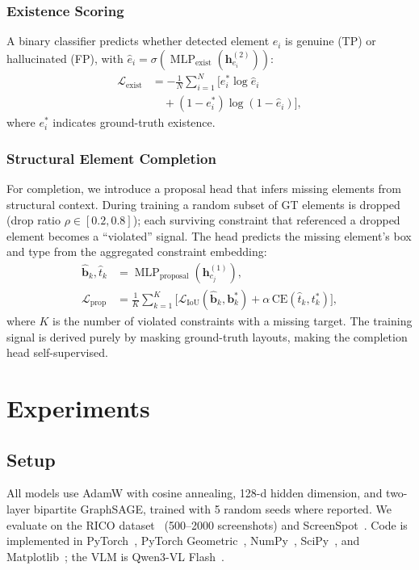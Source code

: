 \documentclass[conference]{IEEEtran}
\begin{document}
\subsubsection{Existence Scoring}
A binary classifier predicts whether detected element $e_i$ is genuine (TP)
or hallucinated (FP), with $\hat{e}_i=\sigma(\operatorname{MLP}_{\text{exist}}
(\mathbf{h}_{e_i}^{(2)}))$:
\begin{equation}
\begin{aligned}
\mathcal{L}_{\text{exist}} &= -\frac{1}{N}\sum_{i=1}^{N}\bigl[e_i^*\log\hat{e}_i \\
&\quad +(1-e_i^*)\log(1-\hat{e}_i)\bigr],
\end{aligned}
\label{eq:lexist}
\end{equation}
where $e_i^*$ indicates ground-truth existence.

\subsubsection{Structural Element Completion}
For completion, we introduce a proposal head that infers missing elements
from structural context. During training a random subset of GT elements is
dropped (drop ratio $\rho\in[0.2,0.8]$); each surviving constraint that
referenced a dropped element becomes a ``violated'' signal. The head predicts the missing element's box and type from the aggregated
constraint embedding:
\begin{equation}
\begin{aligned}
\hat{\mathbf{b}}_k,\hat{t}_k &=
\operatorname{MLP}_{\text{proposal}}(\mathbf{h}_{c_j}^{(1)}), \\
\mathcal{L}_{\text{prop}} &= \frac{1}{K}\sum_{k=1}^{K}\bigl[
\mathcal{L}_{\text{IoU}}(\hat{\mathbf{b}}_k,\mathbf{b}_k^*)
+\alpha\,\mathrm{CE}(\hat{t}_k,t_k^*)\bigr],
\end{aligned}
\label{eq:lprop}
\end{equation}
where $K$ is the number of violated constraints with a missing target. The
training signal is derived purely by masking ground-truth layouts, making the
completion head self-supervised.

\section{Experiments}
\subsection{Setup}
All models use AdamW with cosine annealing, 128-d hidden dimension, and
two-layer bipartite GraphSAGE, trained with 5 random seeds where reported.
We evaluate on the RICO dataset~\cite{dek.a17rico} (500--2000 screenshots)
and ScreenSpot~\cite{cheng2024screenspot}. Code is implemented in
PyTorch~\cite{paszke2019pytorch}, PyTorch Geometric~\cite{fey2019pyg},
NumPy~\cite{harris2020numpy}, SciPy~\cite{virtanen2020scipy}, and
Matplotlib~\cite{hunter2007matplotlib}; the VLM is
Qwen3-VL Flash~\cite{bai2023qwen}.
\end{document}
